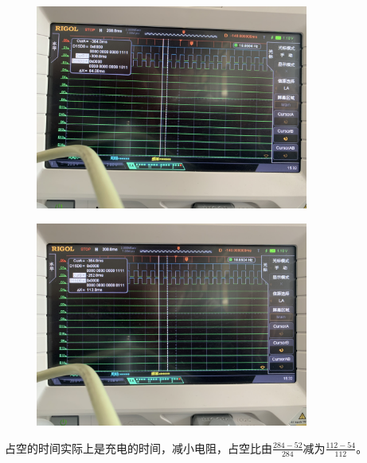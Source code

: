 \documentclass[UTF8, a4paper, 11pt]{article}
\begin{document}
\begin{figure}[H]
    \centering
    \includegraphics[width=0.8\textwidth]{5.png}
\end{figure}
\begin{figure}[H]
    \centering
    \includegraphics[width=0.8\textwidth]{6.png}
\end{figure}
占空的时间实际上是充电的时间，减小电阻，占空比由$\frac{284-52}{284}$减为$\frac{112-54}{112}$。
%
%
\end{document}
